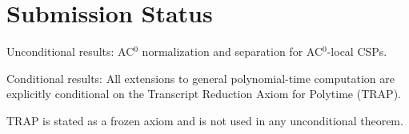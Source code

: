 \section*{Submission Status}

Unconditional results:
AC$^0$ normalization and separation for AC$^0$-local CSPs.

Conditional results:
All extensions to general polynomial-time computation are explicitly
conditional on the Transcript Reduction Axiom for Polytime (TRAP).

TRAP is stated as a frozen axiom and is not used in any unconditional
theorem.

